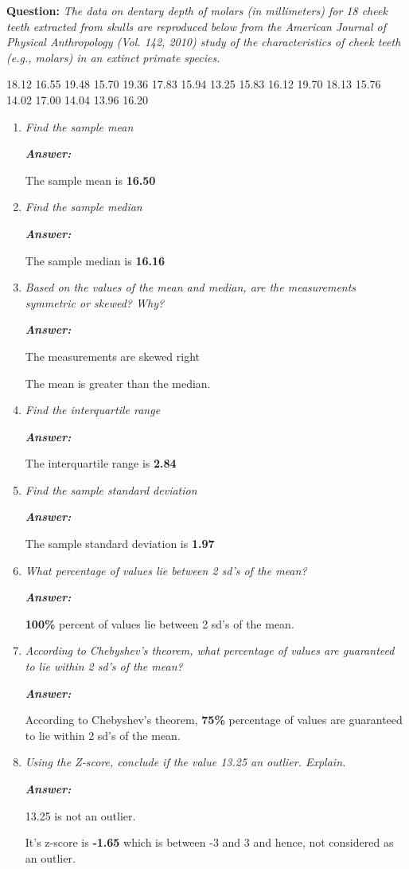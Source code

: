 \documentclass[12pt,letterpaper]{article}
\begin{document}
\textbf{Question:}
\textit{The data on dentary depth of molars (in millimeters) for 18 cheek teeth extracted from skulls are reproduced below from the American Journal of Physical Anthropology (Vol. 142, 2010) study of the characteristics of cheek teeth (e.g., molars) in an extinct primate species.}
\begin{center}
  18.12 16.55 19.48 15.70 19.36 17.83 15.94 13.25 15.83 16.12 19.70 18.13 15.76 14.02 17.00 14.04 13.96 16.20
\end{center}

\begin{enumerate}[1.] \setlength{\itemsep}{30pt}
  \item \textit{Find the sample mean}

  \textbf{\textit{Answer: }}
  
  The sample mean is \textbf{16.50}
  \item \textit{Find the sample median}
  
  \textbf{\textit{Answer: }}
  
  The sample median is \textbf{16.16}
  \item \textit{Based on the values of the mean and median, are the measurements symmetric or skewed? Why?}
  
  \textbf{\textit{Answer: }}

  The measurements are skewed right

  The mean is greater than the median.
  \item \textit{Find the interquartile range}
  
  \textbf{\textit{Answer: }}

  The interquartile range is \textbf{2.84}
  \item \textit{Find the sample standard deviation}
  
  \textbf{\textit{Answer: }}

  The sample standard deviation is \textbf{1.97}
  \newpage
  \item \textit{What percentage of values lie between 2 sd's of the mean?}
  
  \textbf{\textit{Answer: }}

  \textbf{100\%} percent of values lie between 2 sd's of the mean.
  \item \textit{According to Chebyshev's theorem, what percentage of values are guaranteed to lie within 2 sd's of the mean?}
  
  \textbf{\textit{Answer: }}

  According to Chebyshev's theorem, \textbf{75\%} percentage of values are guaranteed to lie within 2 sd's of the mean.
  \item \textit{Using the Z-score, conclude if the value 13.25 an outlier. Explain.}
  
  \textbf{\textit{Answer: }}

  13.25 is not an outlier.

  It's z-score is \textbf{-1.65} which is between -3 and 3 and hence, not considered as an outlier.

\end{enumerate}
\end{document}
